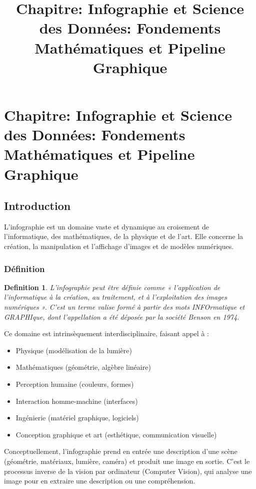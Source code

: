 \documentclass{article}
\title{Chapitre: Infographie et Science des Données: Fondements Mathématiques et Pipeline Graphique}
\date{}
\newtheorem{definition}{Definition}
\begin{document}
\maketitle
\sloppy

\section*{Chapitre: Infographie et Science des Données: Fondements Mathématiques et Pipeline Graphique}

\subsection{Introduction}

L'infographie est un domaine vaste et dynamique au croisement de l'informatique, des mathématiques, de la physique et de l'art. Elle concerne la création, la manipulation et l'affichage d'images et de modèles numériques.

\subsubsection{Définition}

\begin{definition}
L'infographie peut être définie comme « l'application de l'informatique à la création, au traitement, et à l'exploitation des images numériques ». C'est un terme valise formé à partir des mots INFOrmatique et GRAPHIque, dont l'appellation a été déposée par la société Benson en 1974.
\end{definition}

Ce domaine est intrinsèquement interdisciplinaire, faisant appel à :
\begin{itemize}
    \item Physique (modélisation de la lumière)
    \item Mathématiques (géométrie, algèbre linéaire)
    \item Perception humaine (couleurs, formes)
    \item Interaction homme-machine (interfaces)
    \item Ingénierie (matériel graphique, logiciels)
    \item Conception graphique et art (esthétique, communication visuelle)
\end{itemize}

Conceptuellement, l'infographie prend en entrée une description d'une scène (géométrie, matériaux, lumière, caméra) et produit une image en sortie. C'est le processus inverse de la vision par ordinateur (Computer Vision), qui analyse une image pour en extraire une description ou une compréhension.
\end{document}
